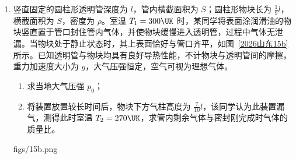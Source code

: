 \documentclass[\gkver]{gaokaozhenti}
\begin{document}
\begin{enumerate}
{\begin{enumerate}
	\item
	$31.25$

	\item
	$0.40$

	\item
	$\frac{d}{l}\Delta x$，可见光

\end{enumerate}
}

\item
竖直固定的圆柱形透明管深度为 $l$，管内横截面积为 $S$；圆柱形物块长为 $\frac{1}{9}l$，横截面积为 $S$，密度为 $\rho$。室温 $T_{1} = 300\UK$ 时，某同学将表面涂润滑油的物块竖直置于管口封住管内气体，并使物块缓慢进入透明管，过程中气体无泄漏。当物块处于静止状态时，其上表面恰好与管口齐平，如图~\ref{2026山东15b} 所示。已知透明管与物块均具有良好导热性能，不计物块与透明管间的摩擦，重力加速度大小为 $g$，大气压强恒定，空气可视为理想气体。
\begin{enumerate}
	\item
	求当地大气压强 $p_{0}$；
	\item
	将装置放置较长时间后，物块下方气柱高度为 $\frac{7}{10}l$，该同学认为此装置漏气，测得此时室温 $T_{2} = 270\UK$，求管内剩余气体与密封刚完成时气体的质量比。
\end{enumerate}
{figs/15b.png}
\end{enumerate}
\end{document}
